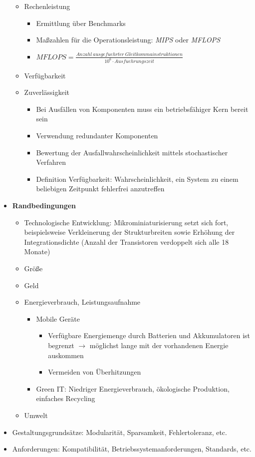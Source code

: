 \begin{itemize}
\begin{itemize}
\begin{itemize}
		\end{itemize}
		\item Rechenleistung
		\begin{itemize}
			\item Ermittlung über Benchmarks
			\item Maßzahlen für die Operationsleistung: \textit{MIPS} oder \textit{MFLOPS}
			\item \(MFLOPS = \frac{Anzahl~ausgefuehrter~Gleitkommainstruktionen}{10^6 \cdot Ausfuehrungszeit}\)
		\end{itemize}
		\item Verfügbarkeit
		\item Zuverlässigkeit
		\begin{itemize}
			\item Bei Ausfällen von Komponenten muss ein betriebsfähiger Kern bereit sein
			\item Verwendung redundanter Komponenten
			\item Bewertung der Ausfallwahrscheinlichkeit mittels stochastischer Verfahren
			\item Definition Verfügbarkeit: Wahrscheinlichkeit, ein System zu einem beliebigen Zeitpunkt fehlerfrei anzutreffen
		\end{itemize}
	\end{itemize}
	\item \textbf{Randbedingungen}
	\begin{itemize}
		\item Technologische Entwicklung: Mikrominiaturisierung setzt sich fort, beispielsweise Verkleinerung der Strukturbreiten sowie Erhöhung der Integrationsdichte (Anzahl der Transistoren verdoppelt sich alle 18 Monate)
		\item Größe
		\item Geld
		\item Energieverbrauch, Leistungsaufnahme
		\begin{itemize}
			\item Mobile Geräte
			\begin{itemize}
				\item Verfügbare Energiemenge durch Batterien und Akkumulatoren ist begrenzt \(\rightarrow\) möglichst lange mit der vorhandenen Energie auskommen
				\item Vermeiden von Überhitzungen
			\end{itemize}
			\item Green IT: Niedriger Energieverbrauch, ökologische Produktion, einfaches Recycling
		\end{itemize}
		\item Umwelt
	\end{itemize}
	\item Gestaltungsgrundsätze: Modularität, Sparsamkeit, Fehlertoleranz, etc.
	\item Anforderungen: Kompatibilität, Betriebssystemanforderungen, Standards, etc.
\end{itemize}

